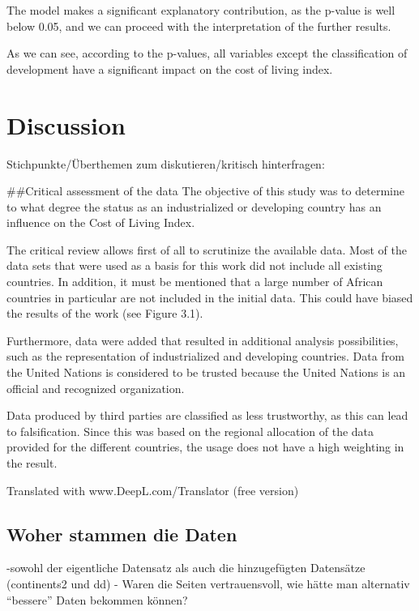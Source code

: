\documentclass[
  11pt,
  a4paper,
  twoside]{scrbook}
\begin{document}
The model makes a significant explanatory contribution, as the p-value is well below 0.05, and we can proceed with the interpretation of the further results.

As we can see, according to the p-values, all variables except the classification of development have a significant impact on the cost of living index.

\hypertarget{discussion}{%
\chapter{Discussion}\label{discussion}}

Stichpunkte/Überthemen zum diskutieren/kritisch hinterfragen:

\#\#Critical assessment of the data
The objective of this study was to determine to what degree the status as an industrialized or developing country has an influence on the Cost of Living Index.

The critical review allows first of all to scrutinize the available data. Most of the data sets that were used as a basis for this work did not include all existing countries. In addition, it must be mentioned that a large number of African countries in particular are not included in the initial data. This could have biased the results of the work (see Figure 3.1).

Furthermore, data were added that resulted in additional analysis possibilities, such as the representation of industrialized and developing countries. Data from the United Nations is considered to be trusted because the United Nations is an official and recognized organization.

Data produced by third parties are classified as less trustworthy, as this can lead to falsification. Since this was based on the regional allocation of the data provided for the different countries, the usage does not have a high weighting in the result.

Translated with www.DeepL.com/Translator (free version)

\hypertarget{woher-stammen-die-daten}{%
\section{Woher stammen die Daten}\label{woher-stammen-die-daten}}

-sowohl der eigentliche Datensatz als auch die hinzugefügten Datensätze (continents2 und dd) - Waren die Seiten vertrauensvoll, wie hätte man alternativ ``bessere'' Daten bekommen können?
\end{document}
